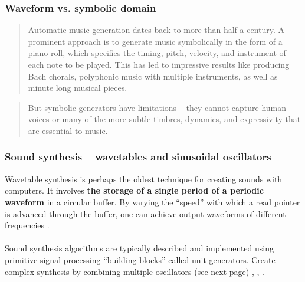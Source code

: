 \documentclass{beamer}
\begin{document}
\begin{frame}
	\frametitle{Waveform vs. symbolic domain}
	\begin{quote}
	Automatic music generation dates back to more than half a century. A prominent approach is to generate music symbolically in the form of a piano roll, which specifies the timing, pitch, velocity, and instrument of each note to be played. This has led to impressive results like producing Bach chorals, polyphonic music with multiple instruments, as well as minute long musical pieces.
	\end{quote}
	\vspace{1em}
	\begin{quote}
	But symbolic generators have limitations -- they cannot capture human voices or many of the more subtle timbres, dynamics, and expressivity that are essential to music.
	\end{quote}
\end{frame}


\begin{frame}
	\frametitle{Sound synthesis -- wavetables and sinusoidal oscillators}
	Wavetable synthesis is perhaps the oldest technique for creating sounds with computers. It involves \textbf{the storage of a single period of a periodic waveform} in a circular buffer. By varying the ``speed'' with which a read pointer is advanced through the buffer, one can achieve output waveforms of different frequencies .\\\ \\
	Sound synthesis algorithms are typically described and implemented using primitive signal processing ``building blocks'' called unit generators. Create complex synthesis by combining multiple oscillators (see next page) , , .
\end{frame}

\end{document}
